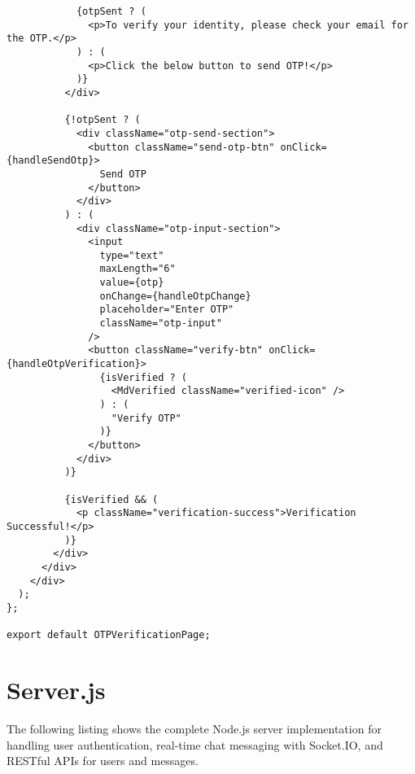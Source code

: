 \documentclass[12pt,a4paper]{report}
\begin{document}
\begin{lstlisting}
            {otpSent ? (
              <p>To verify your identity, please check your email for the OTP.</p>
            ) : (
              <p>Click the below button to send OTP!</p>
            )}
          </div>

          {!otpSent ? (
            <div className="otp-send-section">
              <button className="send-otp-btn" onClick={handleSendOtp}>
                Send OTP
              </button>
            </div>
          ) : (
            <div className="otp-input-section">
              <input
                type="text"
                maxLength="6"
                value={otp}
                onChange={handleOtpChange}
                placeholder="Enter OTP"
                className="otp-input"
              />
              <button className="verify-btn" onClick={handleOtpVerification}>
                {isVerified ? (
                  <MdVerified className="verified-icon" />
                ) : (
                  "Verify OTP"
                )}
              </button>
            </div>
          )}

          {isVerified && (
            <p className="verification-success">Verification Successful!</p>
          )}
        </div>
      </div>
    </div>
  );
};

export default OTPVerificationPage;
\end{lstlisting}


\section{Server.js}

The following listing shows the complete Node.js server implementation for handling user authentication, real-time chat messaging with Socket.IO, and RESTful APIs for users and messages.

\end{document}
